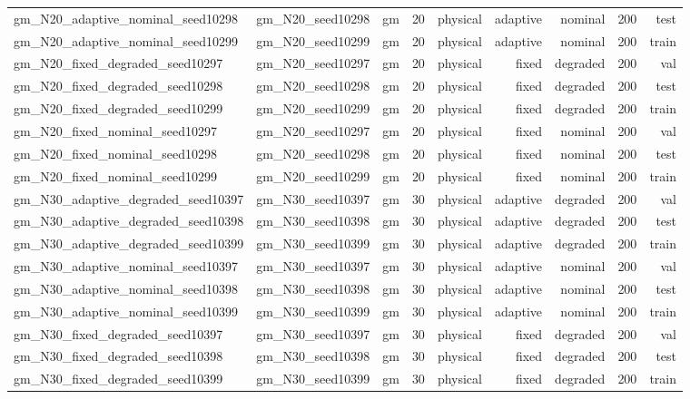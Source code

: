 \begin{tabular}{lrrrrrrrr}
gm\_N20\_adaptive\_nominal\_seed10298 & gm\_N20\_seed10298 & gm & 20 & physical & adaptive & nominal & 200 & test \\
gm\_N20\_adaptive\_nominal\_seed10299 & gm\_N20\_seed10299 & gm & 20 & physical & adaptive & nominal & 200 & train \\
gm\_N20\_fixed\_degraded\_seed10297 & gm\_N20\_seed10297 & gm & 20 & physical & fixed & degraded & 200 & val \\
gm\_N20\_fixed\_degraded\_seed10298 & gm\_N20\_seed10298 & gm & 20 & physical & fixed & degraded & 200 & test \\
gm\_N20\_fixed\_degraded\_seed10299 & gm\_N20\_seed10299 & gm & 20 & physical & fixed & degraded & 200 & train \\
gm\_N20\_fixed\_nominal\_seed10297 & gm\_N20\_seed10297 & gm & 20 & physical & fixed & nominal & 200 & val \\
gm\_N20\_fixed\_nominal\_seed10298 & gm\_N20\_seed10298 & gm & 20 & physical & fixed & nominal & 200 & test \\
gm\_N20\_fixed\_nominal\_seed10299 & gm\_N20\_seed10299 & gm & 20 & physical & fixed & nominal & 200 & train \\
gm\_N30\_adaptive\_degraded\_seed10397 & gm\_N30\_seed10397 & gm & 30 & physical & adaptive & degraded & 200 & val \\
gm\_N30\_adaptive\_degraded\_seed10398 & gm\_N30\_seed10398 & gm & 30 & physical & adaptive & degraded & 200 & test \\
gm\_N30\_adaptive\_degraded\_seed10399 & gm\_N30\_seed10399 & gm & 30 & physical & adaptive & degraded & 200 & train \\
gm\_N30\_adaptive\_nominal\_seed10397 & gm\_N30\_seed10397 & gm & 30 & physical & adaptive & nominal & 200 & val \\
gm\_N30\_adaptive\_nominal\_seed10398 & gm\_N30\_seed10398 & gm & 30 & physical & adaptive & nominal & 200 & test \\
gm\_N30\_adaptive\_nominal\_seed10399 & gm\_N30\_seed10399 & gm & 30 & physical & adaptive & nominal & 200 & train \\
gm\_N30\_fixed\_degraded\_seed10397 & gm\_N30\_seed10397 & gm & 30 & physical & fixed & degraded & 200 & val \\
gm\_N30\_fixed\_degraded\_seed10398 & gm\_N30\_seed10398 & gm & 30 & physical & fixed & degraded & 200 & test \\
gm\_N30\_fixed\_degraded\_seed10399 & gm\_N30\_seed10399 & gm & 30 & physical & fixed & degraded & 200 & train \\

\end{tabular}
